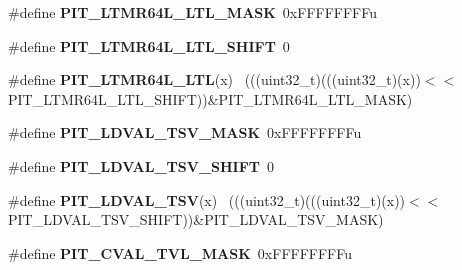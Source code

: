 \begin{DoxyCompactItemize}
\item 
\hypertarget{group___p_i_t___register___masks_gab7337206a85c605ed0ea16b77df99e1a}{}\#define {\bfseries P\+I\+T\+\_\+\+L\+T\+M\+R64\+L\+\_\+\+L\+T\+L\+\_\+\+M\+A\+S\+K}~0x\+F\+F\+F\+F\+F\+F\+F\+Fu\label{group___p_i_t___register___masks_gab7337206a85c605ed0ea16b77df99e1a}

\item 
\hypertarget{group___p_i_t___register___masks_ga773e29842f6f049c17bf141d4cc4fc87}{}\#define {\bfseries P\+I\+T\+\_\+\+L\+T\+M\+R64\+L\+\_\+\+L\+T\+L\+\_\+\+S\+H\+I\+F\+T}~0\label{group___p_i_t___register___masks_ga773e29842f6f049c17bf141d4cc4fc87}

\item 
\hypertarget{group___p_i_t___register___masks_ga72e560c11b97461a70d0addc2c32cdb1}{}\#define {\bfseries P\+I\+T\+\_\+\+L\+T\+M\+R64\+L\+\_\+\+L\+T\+L}(x)                                          ~(((uint32\+\_\+t)(((uint32\+\_\+t)(x))$<$$<$P\+I\+T\+\_\+\+L\+T\+M\+R64\+L\+\_\+\+L\+T\+L\+\_\+\+S\+H\+I\+F\+T))\&P\+I\+T\+\_\+\+L\+T\+M\+R64\+L\+\_\+\+L\+T\+L\+\_\+\+M\+A\+S\+K)\label{group___p_i_t___register___masks_ga72e560c11b97461a70d0addc2c32cdb1}

\item 
\hypertarget{group___p_i_t___register___masks_gab7929b3b8a0c170a50f57d97face5365}{}\#define {\bfseries P\+I\+T\+\_\+\+L\+D\+V\+A\+L\+\_\+\+T\+S\+V\+\_\+\+M\+A\+S\+K}~0x\+F\+F\+F\+F\+F\+F\+F\+Fu\label{group___p_i_t___register___masks_gab7929b3b8a0c170a50f57d97face5365}

\item 
\hypertarget{group___p_i_t___register___masks_ga463855d2b42de901bad9bea868f4f48b}{}\#define {\bfseries P\+I\+T\+\_\+\+L\+D\+V\+A\+L\+\_\+\+T\+S\+V\+\_\+\+S\+H\+I\+F\+T}~0\label{group___p_i_t___register___masks_ga463855d2b42de901bad9bea868f4f48b}

\item 
\hypertarget{group___p_i_t___register___masks_gad83c6bcd6b67260c3f41755dcd2734e0}{}\#define {\bfseries P\+I\+T\+\_\+\+L\+D\+V\+A\+L\+\_\+\+T\+S\+V}(x)                                              ~(((uint32\+\_\+t)(((uint32\+\_\+t)(x))$<$$<$P\+I\+T\+\_\+\+L\+D\+V\+A\+L\+\_\+\+T\+S\+V\+\_\+\+S\+H\+I\+F\+T))\&P\+I\+T\+\_\+\+L\+D\+V\+A\+L\+\_\+\+T\+S\+V\+\_\+\+M\+A\+S\+K)\label{group___p_i_t___register___masks_gad83c6bcd6b67260c3f41755dcd2734e0}

\item 
\hypertarget{group___p_i_t___register___masks_ga2810b877338372cb9b9d944b206c08d3}{}\#define {\bfseries P\+I\+T\+\_\+\+C\+V\+A\+L\+\_\+\+T\+V\+L\+\_\+\+M\+A\+S\+K}~0x\+F\+F\+F\+F\+F\+F\+F\+Fu\label{group___p_i_t___register___masks_ga2810b877338372cb9b9d944b206c08d3}


\end{DoxyCompactItemize}
